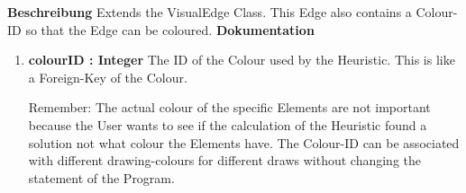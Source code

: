 				\textbf{Beschreibung}\newline
				Extends the VisualEdge Class.
				This Edge also contains a Colour-ID so that the Edge can be coloured.
				\textbf{Dokumentation}\newline
				\begin{enumerate}[-]
					\item{
						\textbf{colourID : Integer} \newline
						The ID of the Colour used by the Heuristic.
						This is like a Foreign-Key of the Colour.
						
						Remember:
						The actual colour of the specific Elements are not important because the User wants to see if the calculation of the Heuristic found a solution not what colour the Elements have.
						The Colour-ID can be associated with different drawing-colours for different draws without changing the statement of the Program.
					}
				\end{enumerate}	
